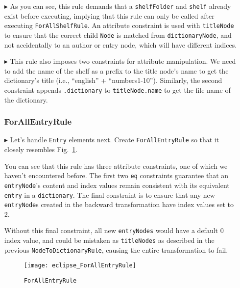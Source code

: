 \begin{itemize}
\newpage

\item[$\blacktriangleright$] As you can see, this rule demands that a \texttt{shelfFolder} and \texttt{shelf} already exist before executing, implying that this
rule can only be called after executing \texttt{ForAllShelfRule}. An attribute constraint is used with \texttt{titleNode} to ensure that the correct child
\texttt{Node} is matched from \texttt{dictionaryNode}, and not accidentally to an author or entry node, which will have different indices.

\item[$\blacktriangleright$] This rule also imposes two constraints for attribute manipulation. We need to add the name of the shelf as a prefix to the title
node's name to get the dictionary's title (i.e., ``english'' + ``numbers1-10''). Similarly, the second constraint appends \texttt{.dictionary} to
\texttt{titleNode.name} to get the file name of the dictionary.

\subsubsection{ForAllEntryRule} %

\item[$\blacktriangleright$] Let's handle \texttt{Entry} elements next. Create \texttt{ForAllEntryRule} so that it closely resembles
Fig.~\ref{eclipse:ForAllEntryRule}.

\vspace{0.5cm}

You can see that this rule has three attribute constraints, one of which we haven't encountered before. The first two \texttt{eq} constraints guarantee that
an \texttt{entryNode}'s content and index values remain consistent with its equivalent \texttt{entry} in a \texttt{dictionary}. The final constraint is to
ensure that any new \texttt{entryNode}s created in the backward transformation have index values set to 2. 

\vspace{0.5cm}

Without this final constraint, all new \texttt{entryNodes} would have a default 0 index value, and
could be mistaken as \texttt{titleNodes} as described in the previous \texttt{NodeToDictionaryRule}, causing the entire transformation to fail.

\newpage

\begin{figure}[htbp]
\begin{center}
  \texttt{[image: eclipse\_ForAllEntryRule]}
  \caption{\texttt{ForAllEntryRule}}
  \label{eclipse:ForAllEntryRule}
\end{center}
\end{figure}


\end{itemize}
